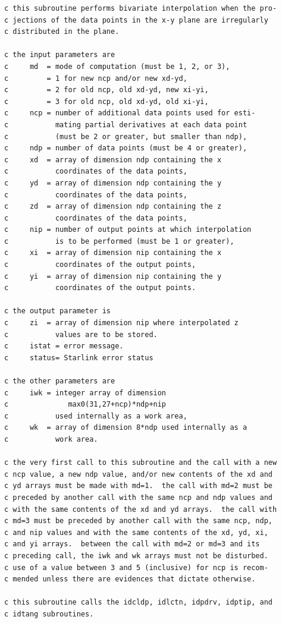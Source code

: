 \documentclass[11pt,twoside]{article}
\begin{document}
\begin{verbatim}
c this subroutine performs bivariate interpolation when the pro-
c jections of the data points in the x-y plane are irregularly
c distributed in the plane.

c the input parameters are
c     md  = mode of computation (must be 1, 2, or 3),
c         = 1 for new ncp and/or new xd-yd,
c         = 2 for old ncp, old xd-yd, new xi-yi,
c         = 3 for old ncp, old xd-yd, old xi-yi,
c     ncp = number of additional data points used for esti-
c           mating partial derivatives at each data point
c           (must be 2 or greater, but smaller than ndp),
c     ndp = number of data points (must be 4 or greater),
c     xd  = array of dimension ndp containing the x
c           coordinates of the data points,
c     yd  = array of dimension ndp containing the y
c           coordinates of the data points,
c     zd  = array of dimension ndp containing the z
c           coordinates of the data points,
c     nip = number of output points at which interpolation
c           is to be performed (must be 1 or greater),
c     xi  = array of dimension nip containing the x
c           coordinates of the output points,
c     yi  = array of dimension nip containing the y
c           coordinates of the output points.

c the output parameter is
c     zi  = array of dimension nip where interpolated z
c           values are to be stored.
c     istat = error message.
c     status= Starlink error status

c the other parameters are
c     iwk = integer array of dimension
c              max0(31,27+ncp)*ndp+nip
c           used internally as a work area,
c     wk  = array of dimension 8*ndp used internally as a
c           work area.

c the very first call to this subroutine and the call with a new
c ncp value, a new ndp value, and/or new contents of the xd and
c yd arrays must be made with md=1.  the call with md=2 must be
c preceded by another call with the same ncp and ndp values and
c with the same contents of the xd and yd arrays.  the call with
c md=3 must be preceded by another call with the same ncp, ndp,
c and nip values and with the same contents of the xd, yd, xi,
c and yi arrays.  between the call with md=2 or md=3 and its
c preceding call, the iwk and wk arrays must not be disturbed.
c use of a value between 3 and 5 (inclusive) for ncp is recom-
c mended unless there are evidences that dictate otherwise.

c this subroutine calls the idcldp, idlctn, idpdrv, idptip, and
c idtang subroutines.
\end{verbatim}
\end{document}

